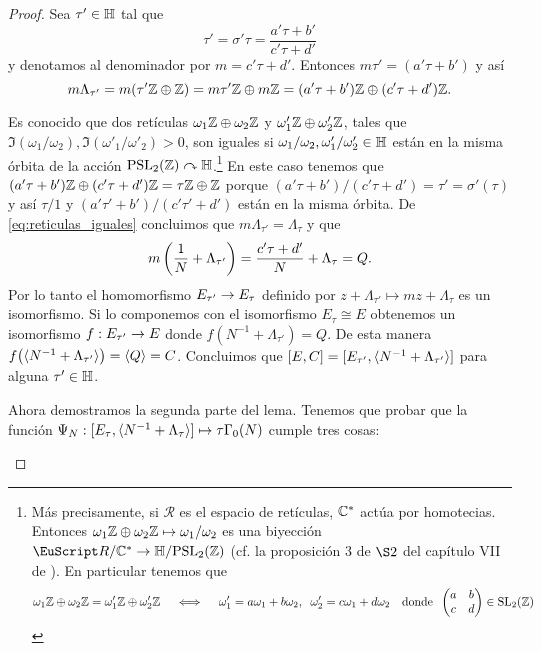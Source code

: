 \documentclass[../../tesis_maestria]{subfiles}
\begin{document}
\begin{proof}
Sea $\tau'\in\mathbb{H}$ tal que
\begin{equation}\label{eq:def_de_matriz_sigma}
  \tau'=\sigma'\tau=\frac{a'\tau+b'}{c'\tau+d'}
\end{equation}
y denotamos al denominador por $m=c'\tau+d'$. Entonces $m\tau'=(a'\tau+b')$ y así
\begin{equation}\label{eq:reticulas_iguales}
	m\Lambda_{\tau'}=
	m(\tau'\mathbb{Z}\oplus\mathbb{Z})=
	m\tau'\mathbb{Z}\oplus m\mathbb{Z}=
	(a'\tau+b')\mathbb{Z}\oplus(c'\tau+d')\mathbb{Z}.
\end{equation}

Es conocido que dos retículas $\omega_1\mathbb{Z}\oplus\omega_2\mathbb{Z}$ y $\omega'_1\mathbb{Z}\oplus\omega'_2\mathbb{Z}$, tales que $\Im(\omega_1/\omega_2),\Im(\omega'_1/\omega'_2)>0$, son iguales si $\omega_1/\omega_2,\omega'_1/\omega'_2\in\mathbb{H}$ están en la misma órbita de la acción $\mathrm{PSL}_2(\mathbb{Z})\curvearrowright\mathbb{H}$.\footnote{\label{foot:reticulas}Más precisamente, si $\mathcal{R}$ es el espacio de retículas, $\mathbb{C}^*$ actúa por homotecias. Entonces $\omega_1\mathbb{Z}\oplus\omega_2\mathbb{Z}\mapsto \omega_1/\omega_2$ es una biyección $\mathcal{R}/\CC^*\ra\HH/\PSL_2(\ZZ)$ (cf. la proposición 3 de $\S2$ del capítulo VII de \cite{SerreACIA}). En particular tenemos que
\[
	\omega_1\mathbb{Z}\oplus\omega_2\mathbb{Z}=\omega'_1\mathbb{Z}\oplus\omega'_2\mathbb{Z} \quad\iff\quad
	\omega'_1=a\omega_1+b\omega_2,\;\;\omega'_2=c\omega_1+d\omega_2\quad\text{donde}\;\;\begin{pmatrix}a & b\\ c & d\end{pmatrix}\in\mathrm{SL}_2(\mathbb{Z})
\]} En este caso tenemos que $(a'\tau+b')\mathbb{Z}\oplus(c'\tau+d')\mathbb{Z}=\tau\mathbb{Z}\oplus\mathbb{Z}$ porque $(a'\tau+b')/(c'\tau+d')=\tau'=\sigma'(\tau)$ y así $\tau/1$ y $(a'\tau'+b')/(c'\tau'+d')$ están en la misma órbita. De \eqref{eq:reticulas_iguales} concluimos que $m\Lambda_{\tau'}=\Lambda_{\tau}$ y que
\[
	m\left( \frac{1}{N}+\Lambda_{\tau'} \right)=\frac{c'\tau+d'}{N}+\Lambda_\tau=Q.
\]
Por lo tanto el homomorfismo $E_{\tau'}\rightarrow E_\tau$ definido por $z+\Lambda_{\tau'}\mapsto mz+\Lambda_{\tau}$ es un isomorfismo. Si lo componemos con el isomorfismo $E_\tau\cong E$ obtenemos un isomorfismo $f:E_{\tau'}\rightarrow E$ donde $f(N^{-1}+\Lambda_{\tau'})=Q$. De esta manera $f\big(\langle N^{-1}+\Lambda_{\tau'} \rangle\big)=\langle Q \rangle=C$. Concluimos que $[E,C]=[E_{\tau'},\langle N^{-1}+\Lambda_{\tau'} \rangle]$ para alguna $\tau'\in\mathbb{H}$.

Ahora demostramos la segunda parte del lema. Tenemos que probar que la función $\Psi_N:[E_\tau,\langle N^{-1}+\Lambda_\tau \rangle]\mapsto\tau\Gamma_0(N)$ cumple tres cosas:
\begin{enumerate}[label=\emph{\roman*})]


\end{enumerate}
\end{proof}
\end{document}
